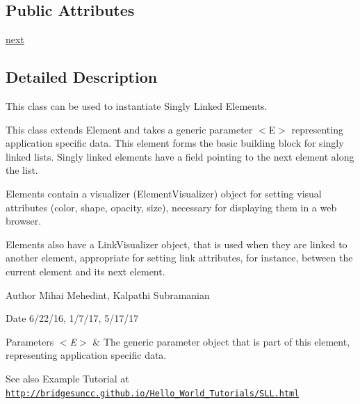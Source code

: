 \subsection*{Public Attributes}
\begin{DoxyCompactItemize}
\item 
\hyperlink{class_bridges_1_1sl__element_1_1_s_lelement_a96a8af8acbfe6f35cfdd1fd8ab16281d}{next}
\end{DoxyCompactItemize}


\subsection{Detailed Description}
This class can be used to instantiate Singly Linked Elements. 

This class extends Element and takes a generic parameter $<$\+E$>$ representing application specific data. This element forms the basic building block for singly linked lists. Singly linked elements have a field pointing to the next element along the list.

\begin{DoxyVerb}Elements contain a visualizer (ElementVisualizer) object for setting visual
attributes (color, shape, opacity, size), necessary for displaying them in a
web browser.

Elements also have a LinkVisualizer object, that is used when they are linked to
another element, appropriate for setting link attributes, for instance, between
the current element and its next element.
\end{DoxyVerb}


\begin{DoxyAuthor}{Author}
Mihai Mehedint, Kalpathi Subramanian
\end{DoxyAuthor}
\begin{DoxyDate}{Date}
6/22/16, 1/7/17, 5/17/17
\end{DoxyDate}

\begin{DoxyParams}{Parameters}
{\em $<$\+E$>$} & The generic parameter object that is part of this element, representing application specific data.\\
\hline
\end{DoxyParams}
\begin{DoxySeeAlso}{See also}
Example Tutorial at ~\newline
 \href{http://bridgesuncc.github.io/Hello_World_Tutorials/SLL.html}{\tt http\+://bridgesuncc.\+github.\+io/\+Hello\+\_\+\+World\+\_\+\+Tutorials/\+S\+L\+L.\+html} 
\end{DoxySeeAlso}


